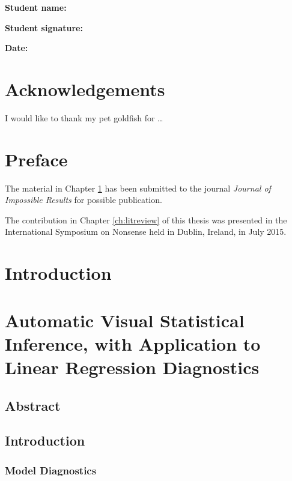 \documentclass{monashthesis}
\begin{document}
\textbf{Student name:} \authorname

\textbf{Student signature:}

\textbf{Date:}

\hypertarget{acknowledgements}{%
\chapter*{Acknowledgements}\label{acknowledgements}}

I would like to thank my pet goldfish for \dots

\hypertarget{preface}{%
\chapter*{Preface}\label{preface}}

The material in Chapter \ref{ch:intro} has been submitted to the journal \emph{Journal of Impossible Results} for possible publication.

The contribution in Chapter \ref{ch:litreview} of this thesis was presented in the International Symposium on Nonsense held in Dublin, Ireland, in July 2015.

\clearpage{}\setcounter{page}{0}

\hypertarget{ch:intro}{%
\chapter{Introduction}\label{ch:intro}}

\hypertarget{ch:paper1}{%
\chapter{Automatic Visual Statistical Inference, with Application to Linear Regression Diagnostics}\label{ch:paper1}}

\hypertarget{abstract-1}{%
\section{Abstract}\label{abstract-1}}

\hypertarget{introduction}{%
\section{Introduction}\label{introduction}}

\hypertarget{model-diagnostics}{%
\subsection{Model Diagnostics}\label{model-diagnostics}}
\end{document}
